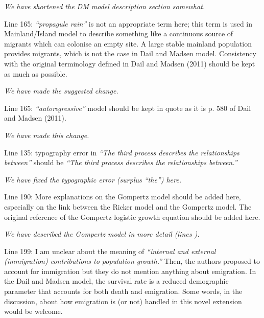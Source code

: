 \documentclass[12pt,english]{article}
\begin{document}
\begin{spacing}{1.9}
\begin{flushleft}
\vspace{0.5cm}
\textit{We have shortened the DM model description section somewhat.}
\vspace{0.5cm}

Line 165: \textit{``propagule rain''} is not an appropriate term here; this term is used in
Mainland/Island model to describe something like a continuous source of migrants which
can colonise an empty site. A large stable mainland population provides migrants, which is
not the case in Dail and Madsen model. Consistency with the original terminology defined in
Dail and Madsen (2011) should be kept as much as possible.

\vspace{0.5cm}
\textit{We have made the suggested change.}
\vspace{0.5cm}

Line 165: \textit{``autoregressive''} model should be kept in quote as it is p. 580 of Dail and Madsen
(2011).

\vspace{0.5cm}
\textit{We have made this change.}
\vspace{0.5cm}

Line 135: typography error in \textit{``The third process describes the relationships between''} should
be \textit{``The third process describes the relationships between.''}

\vspace{0.5cm}
\textit{We have fixed the typographic error (surplus ``the'') here.}
\vspace{0.5cm}

Line 190: More explanations on the Gompertz model should be added here, especially on
the link between the Ricker model and the Gompertz model. The original reference of the
Gompertz logistic growth equation should be added here.

\vspace{0.5cm}
\textit{We have described the Gompertz model in more 
detail (lines ).}

\vspace{0.5cm}

Line 199: I am unclear about the meaning of \textit{``internal and external (immigration)
contributions to population growth.''} Then, the authors proposed to account for immigration
but they do not mention anything about emigration. In the Dail and Madsen model, the
survival rate is a reduced demographic parameter that accounts for both death and
emigration. Some words, in the discussion, about how emigration is (or not) handled in this
novel extension would be welcome.


\end{flushleft}
\end{spacing}
\end{document}
